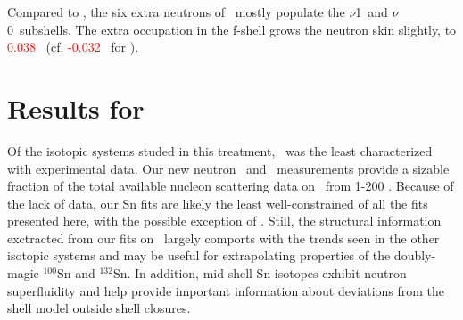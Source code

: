 Compared to \niEight, the six extra neutrons of \niFour\ mostly populate the $\nu$1\pOne\ and
$\nu$0\fFive\ subshells. The extra occupation in the f-shell grows the neutron skin slightly, to 
\textcolor{red}{0.038} \femto\meter\ (cf. \textcolor{red}{-0.032} \femto\meter\ for \niEight).

\section{Results for \snTwelveFour}
Of the isotopic systems studed in this treatment, \snTwelveFour\ was the least characterized with 
experimental data. Our new neutron \tot\ and \el\ measurements provide a sizable fraction
of the total available nucleon scattering data on \snTwelveFour\ from 1-200 \mega\electronvolt.
Because of the lack of data, our Sn fits are likely the least well-constrained of all the fits
presented here, with the possible exception of \niFour.
Still, the structural information exctracted from
our fits on \snTwelveFour\ largely comports with the trends seen in the other isotopic systems and
may be useful for extrapolating properties of the doubly-magic $^{100}$Sn and
$^{132}$Sn. In addition, mid-shell Sn isotopes exhibit neutron superfluidity
and help provide important information
about deviations from the shell model outside shell closures. 

